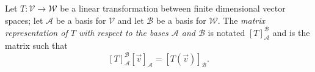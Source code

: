 \documentclass[14pt]{problemset}
\newcommand{\R}{\mathbb{R}}
\begin{document}
	\begin{definition}
		Let $T:\mathcal V\to\mathcal W$ be a linear transformation between finite dimensional vector spaces;
		let $\mathscr A$ be a basis for $\mathcal V$ and let $\mathscr B$ be a basis for $\mathcal W$. 
		The \emph{matrix representation of $T$ with respect to the bases $\mathcal A$ and $\mathcal B$}
		is notated $[T]_{\mathscr A}^{\mathscr B}$ and is the matrix such that
		\[
			[T]_{\mathscr A}^{\mathscr B}[\vec v]_{\mathscr A} = [T(\vec v)]_{\mathscr B}.
		\]
	\end{definition}
\end{document}
